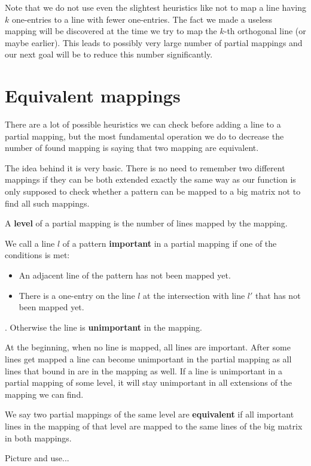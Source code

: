 Note that we do not use even the slightest heuristics like not to map a line having $k$ one-entries to a line with fewer one-entries. The fact we made a useless mapping will be discovered at the time we try to map the $k$-th orthogonal line (or maybe earlier). This leads to possibly very large number of partial mappings and our next goal will be to reduce this number significantly.

\section{Equivalent mappings}
There are a lot of possible heuristics we can check before adding a line to a partial mapping, but the most fundamental operation we do to decrease the number of found mapping is saying that two mapping are equivalent.

The idea behind it is very basic. There is no need to remember two different mappings if they can be both extended exactly the same way as our function is only supposed to check whether a pattern can be mapped to a big matrix not to find all such mappings.

A \textbf{level} of a partial mapping is the number of lines mapped by the mapping.

We call a line $l$ of a pattern \textbf{important} in a partial mapping if one of the conditions is met:
\begin{itemize}
\item An adjacent line of the pattern has not been mapped yet.
\item There is a one-entry on the line $l$ at the intersection with line $l'$ that has not been mapped yet.
\end{itemize}.
Otherwise the line is \textbf{unimportant} in the mapping.

At the beginning, when no line is mapped, all lines are important. After some lines get mapped a line can become unimportant in the partial mapping as all lines that bound in are in the mapping as well. If a line is unimportant in a partial mapping of some level, it will stay unimportant in all extensions of the mapping we can find.

We say two partial mappings of the same level are \textbf{equivalent} if all important lines in the mapping of that level are mapped to the same lines of the big matrix in both mappings.

Picture and use...